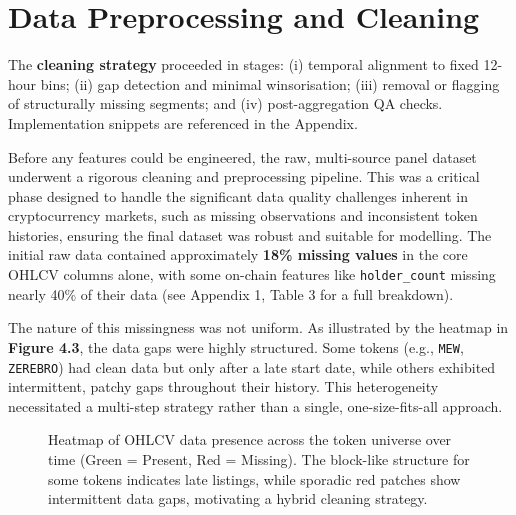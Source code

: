 \documentclass[
  a4paper,
  DIV=11,
  numbers=noendperiod]{scrreprt}
\begin{document}
\section{Data Preprocessing and
Cleaning}\label{data-preprocessing-and-cleaning}

The \textbf{cleaning strategy} proceeded in stages: (i) temporal
alignment to fixed 12-hour bins; (ii) gap detection and minimal
winsorisation; (iii) removal or flagging of structurally missing
segments; and (iv) post-aggregation QA checks. Implementation snippets
are referenced in the Appendix.

Before any features could be engineered, the raw, multi-source panel
dataset underwent a rigorous cleaning and preprocessing pipeline. This
was a critical phase designed to handle the significant data quality
challenges inherent in cryptocurrency markets, such as missing
observations and inconsistent token histories, ensuring the final
dataset was robust and suitable for modelling. The initial raw data
contained approximately \textbf{18\% missing values} in the core OHLCV
columns alone, with some on-chain features like \texttt{holder\_count}
missing nearly 40\% of their data (see Appendix 1, Table 3 for a full
breakdown).

The nature of this missingness was not uniform. As illustrated by the
heatmap in \textbf{Figure 4.3}, the data gaps were highly structured.
Some tokens (e.g., \texttt{MEW}, \texttt{ZEREBRO}) had clean data but
only after a late start date, while others exhibited intermittent,
patchy gaps throughout their history. This heterogeneity necessitated a
multi-step strategy rather than a single, one-size-fits-all approach.

\begin{figure}


\caption{\label{fig-ohlcv-heat}Heatmap of OHLCV data presence across the
token universe over time (Green = Present, Red = Missing). The
block-like structure for some tokens indicates late listings, while
sporadic red patches show intermittent data gaps, motivating a hybrid
cleaning strategy.}

\end{figure}%
\end{document}
